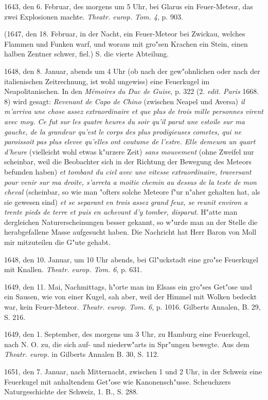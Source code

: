 \documentclass[a4paper, 11pt, oneside, polutonikogreek, german]{article}
\begin{document}
1643, den 6. Februar, des morgens um 5 Uhr, bei Glarus ein Feuer-Meteor, das zwei Explosionen machte. \emph{Theatr. europ. Tom. 4}, p. 903.

(1647, den 18. Februar, in der Nacht, ein Feuer-Meteor bei Zwickau, welches Flammen und Funken warf, und woraus mit gro"sen Krachen ein Stein, einen halben Zentner schwer, fiel.) S. die vierte Abteilung.

1648, den 8. Januar, abends um 4 Uhr (ob nach der gew"ohnlichen oder nach der italienischen Zeitrechnung, ist wohl ungewiss) eine Feuerkugel im Neapolitanischen. In den \emph{Mémoires du Duc de Guise}, p. 322 (2. \emph{edit. Paris} 1668. 8) wird gesagt: \emph{Revenant de Capo de Chino} (zwischen Neapel und Aversa) \emph{il m'arriva une chose assez extraordinaire et que plus de trois mille personnes virent avec moy. Ce fut sur les quatre heures du soir qu'il parut une estoile sur ma gauche, de la grandeur qu'est le corps des plus prodigieuses cometes, qui ne paroissoit pas plus elevee qu'elles ont coutume de l'estre. Elle demeura un quart d'heure} (vielleicht wohl etwas k"urzere Zeit) \emph{sans mouvement} (ohne Zweifel nur scheinbar, weil die Beobachter sich in der Richtung der Bewegung des Meteors befunden haben) \emph{et tombant du ciel avec une vitesse extraordinaire, traversant pour venir sur ma droite, s'arreta a moitie chemin au dessus de la teste de mon cheval} (scheinbar, so wie man "ofters solche Meteore f"ur n"aher gehalten hat, als sie gewesen sind) \emph{et se separant en trois assez grand feux, se reunit environ a trente pieds de terre et puis en achevant d'y tomber, disparut}. H"atte man dergleichen Naturerscheinungen besser gekannt, so w"urde man an der Stelle die herabgefallene Masse aufgesucht haben. Die Nachricht hat Herr Baron von Moll mir mitzuteilen die G"ute gehabt.

1648, den 10. Januar, um 10 Uhr abends, bei Gl"uckstadt eine gro"se Feuerkugel mit Knallen. \emph{Theatr. europ. Tom. 6}, p. 631.

1649, den 11. Mai, Nachmittags, h"orte man im Elsass ein gro"ses Get"ose und ein Sausen, wie von einer Kugel, sah aber, weil der Himmel mit Wolken bedeckt war, kein Feuer-Meteor. \emph{Theatr. europ. Tom. 6}, p. 1016. Gilberts Annalen, B. 29, S. 216.

1649, den 1. September, des morgens um 3 Uhr, zu Hamburg eine Feuerkugel, nach N. O. zu, die sich auf- und niederw"arts in Spr"ungen bewegte. Aus dem \emph{Theatr. europ.} in Gilberts Annalen B. 30, S. 112.

1651, den 7. Januar, nach Mitternacht, zwischen 1 und 2 Uhr, in der Schweiz eine Feuerkugel mit anhaltendem Get"ose wie Kanonensch"usse. Scheuchzers Naturgeschichte der Schweiz, 1. B., S. 288.
\end{document}
